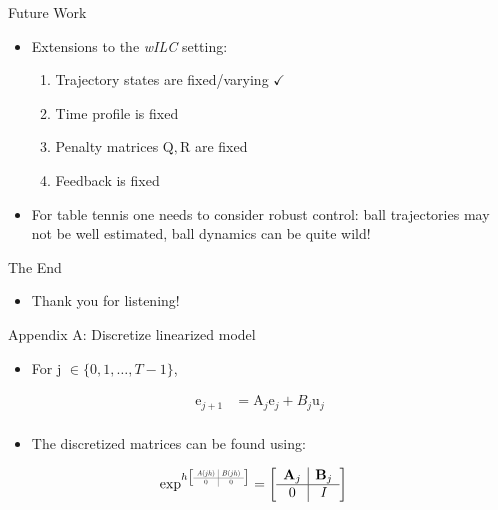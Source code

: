 \documentclass[handout]{beamer}
\newcommand{\boldvec}[1]{\boldsymbol{\mathrm{#1}}}
\let\vec\boldvec
\newcommand\scalemath[2]{\scalebox{#1}{\mbox{\ensuremath{\displaystyle #2}}}} %
\newcommand{\error}{\vec{e}} %
\newcommand{\sysInput}{\vec{u}} %
\newcommand{\alg}{\emph{wILC }}
\begin{document}
%
\begin{frame}{Future Work}
\begin{itemize}
\item Extensions to the \alg setting: 
\begin{enumerate}
\item Trajectory states are fixed/varying $\checkmark$
\item Time profile is fixed
\item Penalty matrices $\vec{Q},\vec{R}$ are fixed
\item Feedback is fixed
\end{enumerate}
\item For table tennis one needs to consider robust control: ball trajectories may not be well estimated, ball dynamics can be quite wild!
\end{itemize}
\end{frame}
%
\begin{frame}{The End}
\begin{itemize}
\item Thank you for listening!
\end{itemize}
\end{frame}
%
\begin{frame}{Appendix A: Discretize linearized model}
\begin{itemize}
\item For j $\in \{ 0, 1, \ldots, T-1 \}$, 
\end{itemize}
\begin{equation*}
\begin{aligned}
\error_{j+1} &= \vec{A}_j\error_j + B_j\sysInput_j \\
\end{aligned}
\end{equation*}

\begin{itemize}
\item The discretized matrices can be found using: 
\linebreak
\end{itemize}
\begin{equation*}
\begin{aligned}
\exp^{h
\left[
\scalemath{0.5}{
\begin{array}{c|c}
A(jh) & B(jh) \\ \hline
0 & 0
\end{array}}\right]}
&= 
\left[
\begin{array}{c|c}
\vec{A}_j & \vec{B}_j \\ \hline
0 & I
\end{array}\right]
\end{aligned}
\end{equation*}
\end{frame}
\end{document}

